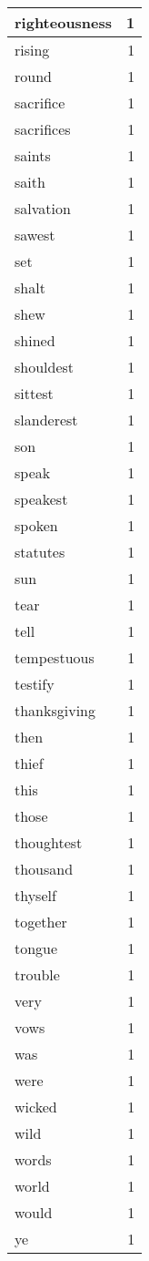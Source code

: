 \begin{center}
\begin{longtable}{l|r}
righteousness & 1 \\ \hline
rising & 1 \\ \hline
round & 1 \\ \hline
sacrifice & 1 \\ \hline
sacrifices & 1 \\ \hline
saints & 1 \\ \hline
saith & 1 \\ \hline
salvation & 1 \\ \hline
sawest & 1 \\ \hline
set & 1 \\ \hline
shalt & 1 \\ \hline
shew & 1 \\ \hline
shined & 1 \\ \hline
shouldest & 1 \\ \hline
sittest & 1 \\ \hline
slanderest & 1 \\ \hline
son & 1 \\ \hline
speak & 1 \\ \hline
speakest & 1 \\ \hline
spoken & 1 \\ \hline
statutes & 1 \\ \hline
sun & 1 \\ \hline
tear & 1 \\ \hline
tell & 1 \\ \hline
tempestuous & 1 \\ \hline
testify & 1 \\ \hline
thanksgiving & 1 \\ \hline
then & 1 \\ \hline
thief & 1 \\ \hline
this & 1 \\ \hline
those & 1 \\ \hline
thoughtest & 1 \\ \hline
thousand & 1 \\ \hline
thyself & 1 \\ \hline
together & 1 \\ \hline
tongue & 1 \\ \hline
trouble & 1 \\ \hline
very & 1 \\ \hline
vows & 1 \\ \hline
was & 1 \\ \hline
were & 1 \\ \hline
wicked & 1 \\ \hline
wild & 1 \\ \hline
words & 1 \\ \hline
world & 1 \\ \hline
would & 1 \\ \hline
ye & 1 \\ \hline
\end{longtable}
\end{center}




